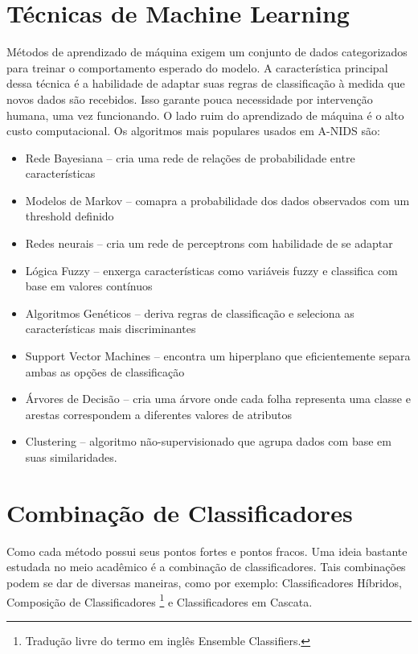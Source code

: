  \section{Técnicas de Machine Learning}
 Métodos de aprendizado de máquina exigem um conjunto de dados categorizados para treinar o comportamento esperado do
 modelo. A característica principal dessa técnica é a habilidade de adaptar suas regras de classificação à medida que
 novos dados são recebidos. Isso garante pouca necessidade por intervenção humana, uma vez funcionando. O lado ruim
 do aprendizado de máquina é o alto custo computacional. Os algoritmos mais populares usados em A-NIDS são:
 \begin{itemize}
    \item Rede Bayesiana -- cria uma rede de relações de probabilidade entre características
    \item Modelos de Markov -- comapra a probabilidade dos dados observados com um threshold definido
    \item Redes neurais -- cria um rede de perceptrons com habilidade de se adaptar
    \item Lógica Fuzzy -- enxerga características como variáveis fuzzy e classifica com base em valores contínuos
    \item Algoritmos Genéticos -- deriva regras de classificação e seleciona as características mais discriminantes
    \item Support Vector Machines -- encontra um hiperplano que eficientemente separa ambas as opções de classificação
    \item Árvores de Decisão -- cria uma árvore onde cada folha representa uma classe e arestas correspondem a
        diferentes valores de atributos
    \item Clustering -- algoritmo não-supervisionado que agrupa dados com base em suas similaridades.
\end{itemize}

\section{Combinação de Classificadores}
Como cada método possui seus pontos fortes e pontos fracos. Uma ideia bastante estudada no meio acadêmico é a
 combinação de classificadores. Tais combinações podem se dar de diversas maneiras, como por exemplo: Classificadores
 Híbridos, Composição de Classificadores \footnote{Tradução livre do termo em inglês Ensemble Classifiers.} e
 Classificadores em Cascata.

